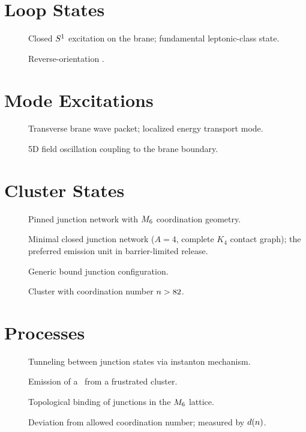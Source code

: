 \documentclass[11pt,a4paper,twoside,openright]{book}
\begin{document}
\section*{Loop States}
\begin{description}
    \item[\LoopState] Closed $S^1$ excitation on the brane; fundamental
        leptonic-class state.
    \item[\AntiLoop] Reverse-orientation \LoopState.
\end{description}

\section*{Mode Excitations}
\begin{description}
    \item[\EdgeMode] Transverse brane wave packet; localized energy transport mode.
    \item[\BulkMode] 5D field oscillation coupling to the brane boundary.
\end{description}

\section*{Cluster States}
\begin{description}
    \item[\ClusterState] Pinned junction network with $M_6$ coordination geometry.
    \item[\ClosedFour] Minimal closed junction network ($A=4$, complete $K_4$ contact
        graph); the preferred emission unit in barrier-limited release.
    \item[\PinningCluster] Generic bound junction configuration.
    \item[\HighCoordCluster] Cluster with coordination number $n > 82$.
\end{description}

\section*{Processes}
\begin{description}
    \item[\JunctionTransition] Tunneling between junction states via instanton
        mechanism.
    \item[\ClosedFourRelease] Emission of a \ClosedFour\ from a frustrated cluster.
    \item[\Pinning] Topological binding of junctions in the $M_6$ lattice.
    \item[\Frustration] Deviation from allowed coordination number; measured by
        $d(n)$.
\end{description}
\end{document}
